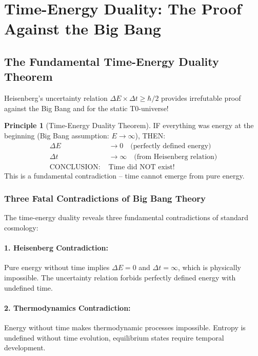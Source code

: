 \documentclass[12pt,a4paper]{article}
\theoremstyle{definition}
\newtheorem{principle}{Principle}
\begin{document}
	\section{Time-Energy Duality: The Proof Against the Big Bang}
	
	\subsection{The Fundamental Time-Energy Duality Theorem}
	
	\begin{revolutionary}
		Heisenberg's uncertainty relation $\Delta E \times \Delta t \geq \hbar/2$ provides irrefutable proof against the Big Bang and for the static T0-universe!
	\end{revolutionary}
	
	\begin{principle}[Time-Energy Duality Theorem]
		IF everything was energy at the beginning (Big Bang assumption: $E \rightarrow \infty$), THEN:
		\begin{align}
			\Delta E &\rightarrow 0 \quad \text{(perfectly defined energy)} \\
			\Delta t &\rightarrow \infty \quad \text{(from Heisenberg relation)} \\
			\text{CONCLUSION: } &\text{Time did NOT exist!}
		\end{align}
		This is a fundamental contradiction -- time cannot emerge from pure energy.
	\end{principle}
	
	\subsubsection{Three Fatal Contradictions of Big Bang Theory}
	
	\begin{important}
		The time-energy duality reveals three fundamental contradictions of standard cosmology:
	\end{important}
	
	\paragraph{1. Heisenberg Contradiction:}
	Pure energy without time implies $\Delta E = 0$ and $\Delta t = \infty$, which is physically impossible. The uncertainty relation forbids perfectly defined energy with undefined time.
	
	\paragraph{2. Thermodynamics Contradiction:}
	Energy without time makes thermodynamic processes impossible. Entropy is undefined without time evolution, equilibrium states require temporal development.
	
\end{document}
